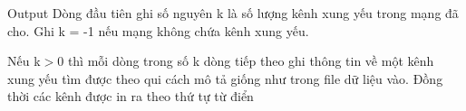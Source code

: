 Output
Dòng đầu tiên ghi số nguyên k là số lượng kênh xung yếu trong mạng đã cho. Ghi k = -1 nếu mạng không chứa kênh xung yếu.

Nếu k$>$0 thì mỗi dòng trong số k dòng tiếp theo ghi thông tin về một kênh xung yếu tìm được theo qui cách mô tả giống như trong file dữ liệu vào. Đồng thời các kênh được in ra theo thứ tự từ điển
